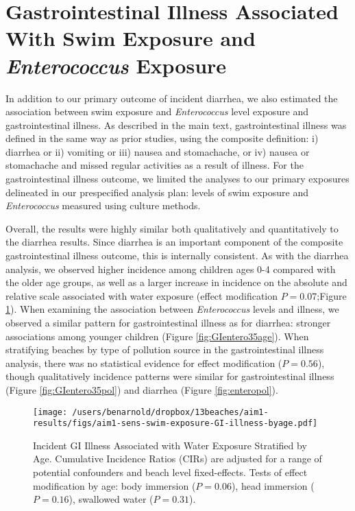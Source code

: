 \documentclass[12pt]{article}\usepackage[]{graphicx}\usepackage[]{color}
\begin{document}
\section{Gastrointestinal Illness Associated With Swim Exposure and \textit{Enterococcus} Exposure}

In addition to our primary outcome of incident diarrhea, we also estimated the association between swim exposure and \textit{Enterococcus} level exposure and gastrointestinal illness. As described in the main text, gastrointestinal illness was defined in the same way as prior studies,\supercite{Wade2010-bb,Wade2010-ps,Colford2012-um,Arnold2013-xd,Yau2014-pl} using the composite definition: i) diarrhea or ii) vomiting or iii) nausea and stomachache, or iv) nausea or stomachache and missed regular activities as a result of illness.  For the gastrointestinal illness outcome, we limited the analyses to our primary exposures delineated in our prespecified analysis plan: levels of swim exposure and \textit{Enterococcus} measured using culture methods.

Overall, the results were highly similar both qualitatively and quantitatively to the diarrhea results. Since diarrhea is an important component of the composite gastrointestinal illness outcome, this is internally consistent.  As with the diarrhea analysis, we observed higher incidence among children ages 0-4 compared with the older age groups, as well as a larger increase in incidence on the absolute and relative scale associated with water exposure (effect modification $P=0.07$;Figure \ref{fig:GIswimex}).  When examining the association between \textit{Enterococcus} levels and illness, we observed a similar pattern for gastrointestinal illness as for diarrhea: stronger associations among younger children (Figure \ref{fig:GIentero35age}). When stratifying beaches by type of pollution source in the gastrointestinal illness analysis, there was no statistical evidence for effect modification ($P=0.56$), though qualitatively incidence patterns were similar for gastrointestinal illness (Figure \ref{fig:GIentero35pol}) and diarrhea (Figure \ref{fig:enteropol}).

\begin{landscape}
\begin{figure}[htbp]
\begin{center}
\texttt{[image: /users/benarnold/dropbox/13beaches/aim1-results/figs/aim1-sens-swim-exposure-GI-illness-byage.pdf]}
\begin{minipage}{1.2\textwidth}
\caption{Incident GI Illness Associated with Water Exposure Stratified by Age. Cumulative Incidence Ratios (CIRs) are adjusted for a range of potential confounders and beach level fixed-effects. Tests of effect modification by age: body immersion ($P=0.06$), head immersion ($P=0.16$), swallowed water ($P=0.31$).}
\label{fig:GIswimex}
\end{minipage}
\end{center}
\end{figure}
\end{landscape}
\end{document}
